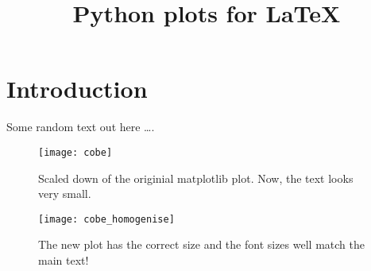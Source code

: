 \documentclass[twocolumn,a4paper]{scrartcl}
\title{Python plots for LaTeX}
\begin{document}
\maketitle
\section{Introduction}
Some random text out here \dots.
%
\begin{figure}
  \centering
  \texttt{[image: cobe]}
  \caption{Scaled down of the originial matplotlib plot.
    Now, the text looks very small.}
  \label{image1}
\end{figure}
%
\begin{figure}
  \centering
  \texttt{[image: cobe\_homogenise]}
  \caption{The new plot has the correct size and the
  font sizes well match the main text!}
  \label{image2}
\end{figure}
\end{document}

